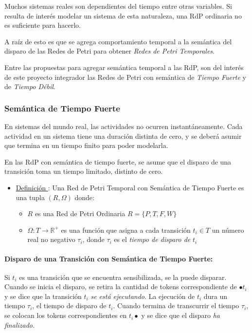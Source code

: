 Muchos sistemas reales son dependientes del tiempo entre otras variables. Si
resulta de interés modelar un sistema de esta naturaleza, una RdP ordinaria no
es suficiente para hacerlo.

A raíz de esto es que se agrega comportamiento temporal a la semántica del
disparo de las Redes de Petri para obtener \textit{Redes de Petri Temporales}.

Entre las propuestas para agregar semántica temporal a las RdP, son del interés
de este proyecto integrador las Redes de Petri con semántica de \textit{Tiempo
Fuerte} y de \textit{Tiempo Débil}.

\subsubsection{Semántica de Tiempo Fuerte}

En sistemas del mundo real, las actividades no ocurren instantáneamente. Cada
actividad en un sistema tiene una duración distinta de cero, y se deberá asumir
que termina en un tiempo finito para poder modelarla.
\cite{Ramchandani:1974:AAC:889750}

En las RdP con semántica de tiempo fuerte, se asume que el disparo de una
transición toma un tiempo limitado, distinto de cero.

\begin{itemize}
  \item \underline{Definición \thedefinitionsCounter}: Una Red de Petri Temporal con Semántica de
  Tiempo Fuerte es una tupla $(R, \Omega)$ donde:
  \begin{itemize}
    \item $R$ es una Red de Petri Ordinaria $R = \{P, T, F, W \}$
    \item $\Omega: T \rightarrow \mathbb{R^{+}}$ es una función que asigna
    a cada transición $t_{i} \in T$ un número real no negativo $\tau_{i}$,
    donde $\tau_{i}$ es el \textit{tiempo de disparo de} $t_{i}$
  \end{itemize}
\end{itemize}

\paragraph{Disparo de una Transición con Semántica de Tiempo Fuerte:}

Si $t_{i}$ es una transición que se encuentra sensibilizada, se la puede
disparar. Cuando se inicia el disparo, se retira la cantidad de tokens
correspondiente de $\bullet t_{i}$ y se dice que la transición $t_{i}$
\textit{se está ejecutando}.
La ejecución de $t_{i}$ dura un tiempo $\tau_{i}$, el tiempo de disparo de
$t_{i}$.
Cuando termina de transcurrir el tiempo $\tau_{i}$, se colocan los tokens
correspondientes en $t_{i} \bullet$ y se dice que el disparo \textit{ha
finalizado}.

